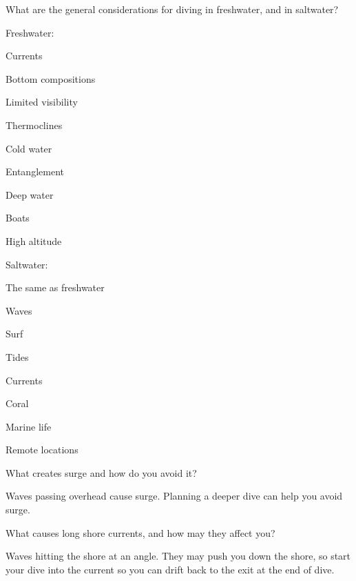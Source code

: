 	\begin{qanda}
		\begin{question}
What are the general considerations for diving in freshwater, and in saltwater?
		\end{question}

		\begin{answer}
Freshwater:
			\begin{bulletedlist}
				\item Currents
				\item Bottom compositions
				\item Limited visibility
				\item Thermoclines
				\item Cold water
				\item Entanglement
				\item Deep water
				\item Boats
				\item High altitude
			\end{bulletedlist}
Saltwater:
			\begin{nospacebulletedlist}
				\item The same as freshwater
				\item Waves
				\item Surf
				\item Tides
				\item Currents
				\item Coral
				\item Marine life
				\item Remote locations
			\end{nospacebulletedlist}
		\end{answer}
	\end{qanda}

	\begin{qanda}
		\begin{question}
What creates surge and how do you avoid it?
		\end{question}

		\begin{answer}
Waves passing overhead cause surge.  Planning a deeper dive can help you avoid surge.
		\end{answer}
	\end{qanda}

	\begin{qanda}
		\begin{question}
What causes long shore currents, and how may they affect you?
		\end{question}

		\begin{answer}
Waves hitting the shore at an angle.  They may push you down the shore, so start your dive into the current so you can drift back to the exit at the end of dive.
		\end{answer}
	\end{qanda}

